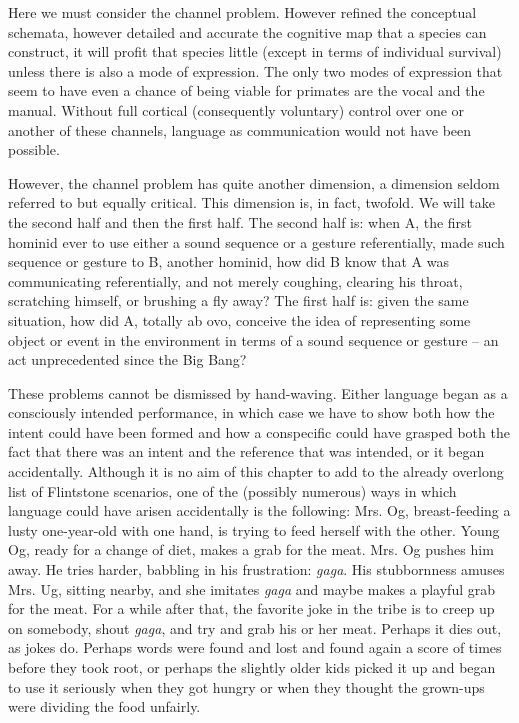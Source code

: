 Here we must consider the channel problem. However refined the conceptual schemata, however detailed and accurate the cognitive map that a species can construct, it will profit that species little (except in terms of individual survival) unless there is also a mode of expression. The only two modes of expression that seem to have even a chance of being viable for primates are the vocal and the manual. Without full cortical (consequently voluntary) control over one or another of these channels, language as communication would not have been possible.

However, the channel problem has quite another dimension, a dimension seldom referred to but equally critical. This dimension is, in fact, twofold. We will take the second half and then the first half. The second half is: when A, the first hominid ever to use either a sound sequence or a gesture referentially, made such sequence or gesture to B, another hominid, how did B know that A was communicating referentially, and not merely coughing, clearing his throat, scratching himself, or brushing a fly away? The first half is: given the same situation, how did A, totally ab ovo, conceive the idea of representing some object or event in the environment in terms of a sound sequence or gesture -- an act unprecedented since the Big Bang?


These problems cannot be dismissed by hand-waving. Either language began as a consciously intended performance, in which case we have to show both how the intent could have been formed and how a conspecific could have grasped both the fact that there was an intent and the reference that was intended, or it began accidentally. Although it is no aim of this chapter to add to the already overlong list of Flintstone scenarios, one of the (possibly numerous) ways in which language could have arisen accidentally is the following: Mrs. Og, breast-feeding a lusty one-year-old with one hand, is trying to feed herself with the other. Young Og, ready for a change of diet, makes a grab for the meat. Mrs. Og pushes him away. He tries harder, babbling in his frustration: \textit{gaga}. His stubbornness amuses Mrs. Ug, sitting nearby, and she imitates \textit{gaga} and maybe makes a playful grab for the meat. For a while after that, the favorite joke in the tribe is to creep up on somebody, shout \textit{gaga}, and try and grab his or her meat. Perhaps it dies out, as jokes do. Perhaps words were found and lost and found again a score of times before they took root, or perhaps the slightly older kids picked it up and began to use it seriously when they got hungry or when they thought the grown-ups were dividing the food unfairly.

